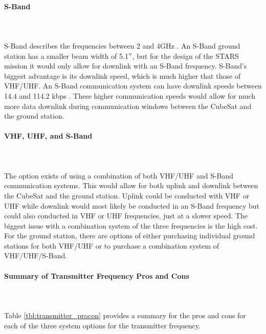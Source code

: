 \paragraph{S-Band} ~\\~\\
S-Band describes the frequencies between 2 and 4GHz \cite{ITU}. An S-Band ground station has a smaller beam width of 5.1$\degree$, but for the design of the STARS mission it would only allow for downlink with an S-Band frequency. S-Band's biggest advantage is its downlink speed, which is much higher that those of VHF/UHF. An S-Band communication system can have downlink speeds between 14.4 and 114.2 kbps \cite{isis_ground}. These higher communication speeds would allow for much more data downlink during communication windows between the CubeSat and the ground station. 

\paragraph{VHF, UHF, and S-Band} ~\\~\\
The option exists of using a combination of both VHF/UHF and S-Band communication systems. This would allow for both uplink and downlink between the CubeSat and the ground station. Uplink could be conducted with VHF or UHF while downlink would most likely be conducted in an S-Band frequency but could also conducted in VHF or UHF frequencies, just at a slower speed. The biggest issue with a combination system of the three frequencies is the high cost. For the ground station, there are options of either purchasing individual ground stations for both VHF/UHF or to purchase a combination system of VHF/UHF/S-Band. 

\paragraph{Summary of Transmitter Frequency Pros and Cons} ~\\~\\
Table \ref{tbl:transmitter_procon} provides a summary for the pros and cons for each of the three system options for the transmitter frequency. 

